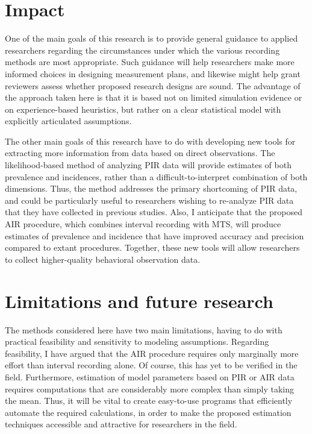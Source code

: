 \documentclass[11pt]{article}
\begin{document}
\section{Impact}

One of the main goals of this research is to provide general guidance to applied researchers regarding the circumstances under which the various recording methods are most appropriate. Such guidance will help researchers make more informed choices in designing measurement plans, and likewise might help grant reviewers assess whether proposed research designs are sound. The advantage of the approach taken here is that it is based not on limited simulation evidence or on experience-based heuristics, but rather on a clear statistical model with explicitly articulated assumptions. 

The other main goals of this research have to do with developing new tools for extracting more information from data based on direct observations. The likelihood-based method of analyzing PIR data will provide estimates of both prevalence and incidences, rather than a difficult-to-interpret combination of both dimensions. Thus, the method addresses the primary shortcoming of PIR data, and could be particularly useful to researchers wishing to re-analyze PIR data that they have collected in previous studies. Also, I anticipate that the proposed AIR procedure, which combines interval recording with MTS, will produce estimates of prevalence and incidence that have improved accuracy and precision compared to extant procedures. Together, these new tools will allow researchers to collect higher-quality behavioral observation data. 

\section{Limitations and future research}

The methods considered here have two main limitations, having to do with practical feasibility and sensitivity to modeling assumptions. Regarding feasibility, I have argued that the AIR procedure requires only marginally more effort than interval recording alone. Of course, this has yet to be verified in the field. Furthermore, estimation of model parameters based on PIR or AIR data requires computations that are considerably more complex than simply taking the mean. Thus, it will be vital to create easy-to-use programs that efficiently automate the required calculations, in order to make the proposed estimation techniques accessible and attractive for researchers in the field.  
\end{document}
